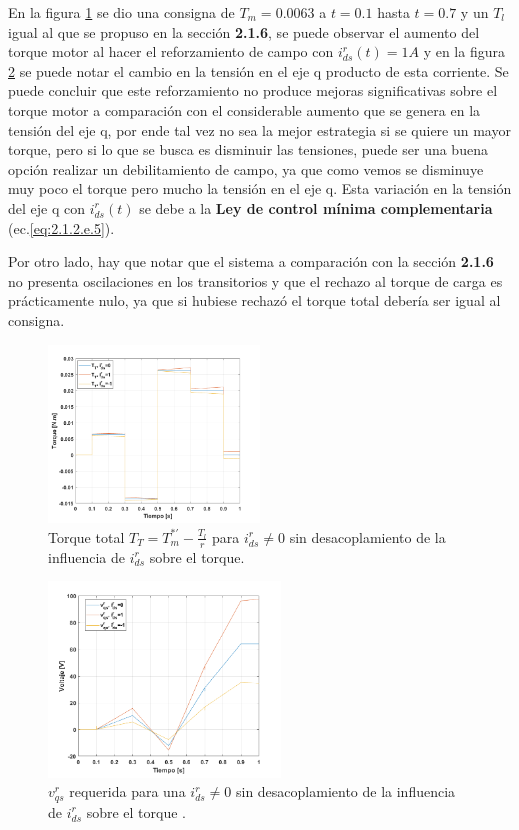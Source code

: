 \documentclass[10pt]{article}
\begin{document}
\begin{itemize}
	En la figura \ref{fig:TTmodulador_id} se dio una consigna de $T_{m}=0.0063$ a $t=0.1$ hasta $t=0.7$ y un $T_{l}$ igual al que se propuso en la sección \textbf{2.1.6}, se puede observar el aumento del torque motor al hacer el reforzamiento de campo con $i^{r}_{ds}(t)=1 A$ y en la figura \ref{fig:vqmodulador_id} se puede notar el cambio en la tensión en el eje q producto de esta corriente.
	Se puede concluir que este reforzamiento no produce mejoras significativas sobre el torque motor a comparación con el considerable aumento que se genera en la tensión del eje q, por ende tal vez no sea la mejor estrategia si se quiere un mayor torque, pero si lo que se busca es disminuir las tensiones, puede ser una buena opción realizar un debilitamiento de campo, ya que como vemos se disminuye muy poco el torque pero mucho la tensión en el eje q.
	Esta variación en la tensión del eje q con $i^{r}_{ds}(t)$  se debe a la \textbf{Ley de control mínima complementaria} (ec.\ref{eq:2.1.2.e.5}).
	
	Por otro lado, hay que notar que el sistema a comparación con la sección \textbf{2.1.6} no presenta oscilaciones en los transitorios y que el rechazo al torque de carga es prácticamente nulo, ya que si hubiese rechazó el torque total debería ser igual al consigna. 
	 	\begin{figure}[h!]
	\centering
	\includegraphics[width=0.5\textwidth]{TTmodulador_id.png}
	\caption{\label{fig:TTmodulador_id}Torque total $T_{T}=T^{*'}_{m}-\frac{T_{l}}{r}$ para $i^{r}_{ds}\neq0$ sin desacoplamiento de la influencia de $i^{r}_{ds}$ sobre el torque.}
	\end{figure}
		 	\begin{figure}[h!]
	\centering
	\includegraphics[width=0.55\textwidth]{Tmodulador_id.png}
	\caption{\label{fig:vqmodulador_id}$v^{r}_{qs}$ requerida para una $i^{r}_{ds}\neq0$ sin desacoplamiento de la influencia de $i^{r}_{ds}$ sobre el torque .}
	\end{figure}
\end{itemize}
\end{document}
